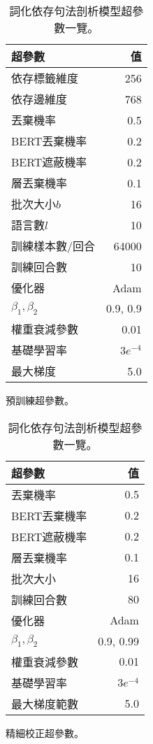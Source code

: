 \begin{table}[htbp]
    \centering
    \begin{subtable}[t]{.4\textwidth}
        \begin{tabular}[t]{@{}lr@{}}
        \toprule
        超參數 & 值 \\
        \midrule
            依存標籤維度         & 256 \\
            依存邊維度           & 768 \\
            丟棄機率            & 0.5 \\
            BERT丟棄機率        & 0.2 \\
            BERT遮蔽機率        & 0.2 \\
            層丟棄機率          & 0.1 \\
            批次大小$b$         & 16 \\
            語言數$l$           & 10 \\
            訓練樣本數/回合        & 64000 \\
            訓練回合數          & 10 \\
            優化器              & Adam \\
            $\beta_1,\beta_2$  & 0.9, 0.9 \\
            權重衰減參數         & 0.01 \\
            基礎學習率          & $3e^{-4}$ \\
            最大梯度            & 5.0 \\
        \bottomrule
        \end{tabular}
        \caption{
            預訓練超參數。
        }
        \label{tab:pretrain_hparams}
    \end{subtable}
    \begin{subtable}[t]{.4\textwidth}
        \begin{tabular}[t]{@{}lr@{}}
        \toprule
        超參數 & 值 \\
        \midrule
            丟棄機率            & 0.5 \\
            BERT丟棄機率        & 0.2 \\
            BERT遮蔽機率        & 0.2 \\
            層丟棄機率          & 0.1 \\
            批次大小            & 16 \\
            訓練回合數          & 80 \\
            優化器              & Adam \\
            $\beta_1,\beta_2$  & 0.9, 0.99 \\
            權重衰減參數         & 0.01 \\
            基礎學習率          & $3e^{-4}$ \\
            最大梯度範數        & 5.0 \\
        \bottomrule
        \end{tabular}
        \caption{
            精細校正超參數。
        }
        \label{tab:finetune_hparams}
    \end{subtable}
    \caption{
        詞化依存句法剖析模型超參數一覽。
    }
    \label{tab:hparams}
\end{table}
